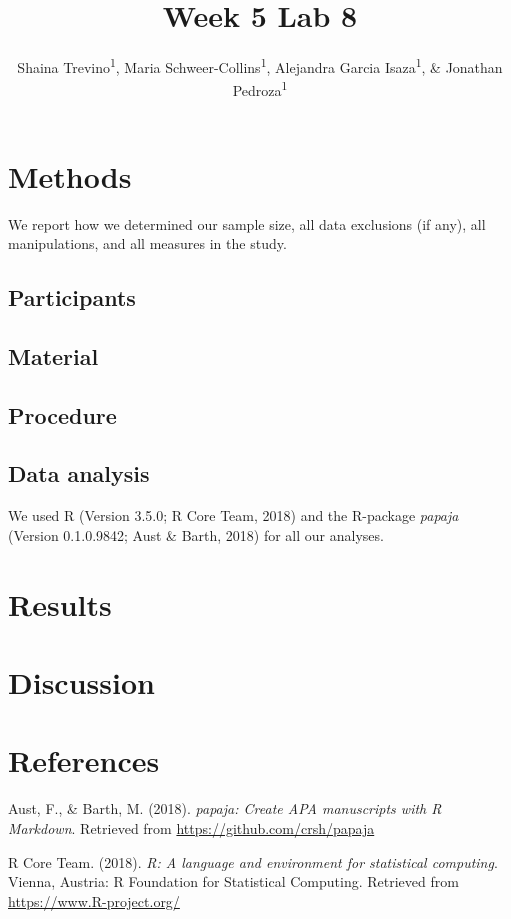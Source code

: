 \documentclass[man]{apa6}
\title{Week 5 Lab 8}
\author{Shaina Trevino\textsuperscript{1}, Maria
Schweer-Collins\textsuperscript{1}, Alejandra Garcia
Isaza\textsuperscript{1}, \& Jonathan Pedroza\textsuperscript{1}}
\date{}
\affiliation{
\vspace{0.5cm}
\textsuperscript{1} University of Oregon}
\begin{document}
\maketitle

\section{Methods}\label{methods}

We report how we determined our sample size, all data exclusions (if
any), all manipulations, and all measures in the study.

\subsection{Participants}\label{participants}

\subsection{Material}\label{material}

\subsection{Procedure}\label{procedure}

\subsection{Data analysis}\label{data-analysis}

We used R (Version 3.5.0; R Core Team, 2018) and the R-package
\emph{papaja} (Version 0.1.0.9842; Aust \& Barth, 2018) for all our
analyses.

\section{Results}\label{results}

\section{Discussion}\label{discussion}

\newpage

\section{References}\label{references}

\begingroup
\setlength{\parindent}{-0.5in} \setlength{\leftskip}{0.5in}

\hypertarget{refs}{}
\hypertarget{ref-R-papaja}{}
Aust, F., \& Barth, M. (2018). \emph{papaja: Create APA manuscripts with
R Markdown}. Retrieved from \url{https://github.com/crsh/papaja}

\hypertarget{ref-R-base}{}
R Core Team. (2018). \emph{R: A language and environment for statistical
computing}. Vienna, Austria: R Foundation for Statistical Computing.
Retrieved from \url{https://www.R-project.org/}

\endgroup
\end{document}
